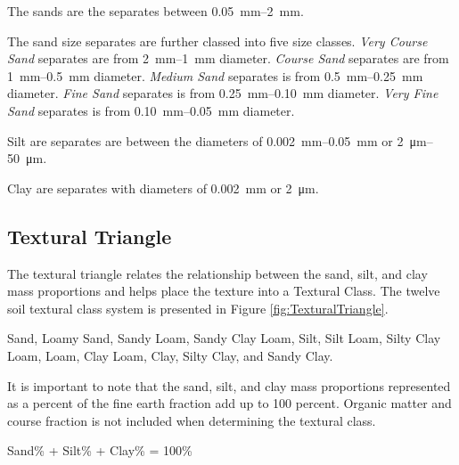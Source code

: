 \documentclass[letterpaper, 12pt]{article}
\begin{document}
The sands are the separates between \qtyrange{0.05}{2}{mm}.

The sand size separates are further classed into five size classes. \textit{Very Course Sand} separates are from \qtyrange{2}{1}{mm} diameter. \textit{Course Sand} separates are from \qtyrange{1}{0.5}{mm} diameter. \textit{Medium Sand} separates is from \qtyrange{0.5}{0.25}{mm} diameter. \textit{Fine Sand} separates is from \qtyrange{0.25}{0.10}{mm} diameter. \textit{Very Fine Sand} separates is from \qtyrange{0.10}{0.05}{mm} diameter.
    
Silt are separates are between the diameters of \qtyrange{0.002}{0.05}{mm} or \qtyrange{2}{50}{\micro\metre}.

Clay are separates with diameters of \qty{0.002}{mm} or \qty{2}{\micro\metre}.

\subsection{Textural Triangle}
    
The textural triangle relates the relationship between the sand, silt, and clay mass proportions and helps place the texture into a Textural Class. The twelve soil textural class system is presented in Figure \ref{fig:TexturalTriangle}.
    
Sand, Loamy Sand, Sandy Loam, Sandy Clay Loam, Silt, Silt Loam, Silty Clay Loam, Loam, Clay Loam, Clay, Silty Clay, and Sandy Clay.
    
It is important to note that the sand, silt, and clay mass proportions represented as a percent of the fine earth fraction add up to 100 percent. Organic matter and course fraction is not included when determining the textural class.
    
\begin{center}
Sand\% + Silt\% + Clay\% = 100\%
\end{center}
    
    
\end{document}

